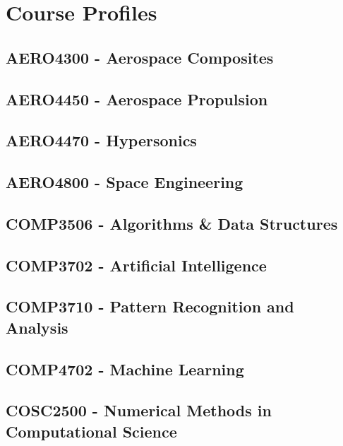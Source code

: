 \documentclass[a4paper,12pt]{report}
\begin{document}
\chapter{Course Profiles}
\hypertarget{AERO4300}{\section{AERO4300 - Aerospace Composites}}

\hypertarget{AERO4450}{\section{AERO4450 - Aerospace Propulsion}}

\hypertarget{AERO4470}{\section{AERO4470 - Hypersonics}}

\hypertarget{AERO4800}{\section{AERO4800 - Space Engineering}}

\hypertarget{COMP3506}{\section{COMP3506 - Algorithms \& Data Structures}}

\hypertarget{COMP3702}{\section{COMP3702 - Artificial Intelligence}}

\hypertarget{COMP3710}{\section{COMP3710 - Pattern Recognition and Analysis}}

\hypertarget{COMP4702}{\section{COMP4702 - Machine Learning}}

\hypertarget{COSC2500}{\section{COSC2500 - Numerical Methods in Computational Science}}
\end{document}

